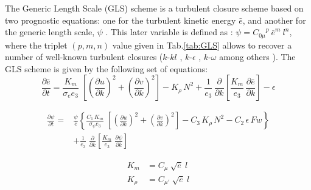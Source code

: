 \documentclass[../tex_main/NEMO_manual]{subfiles}
\begin{document}

The Generic Length Scale (GLS) scheme is a turbulent closure scheme based on 
two prognostic equations: one for the turbulent kinetic energy $\bar {e}$, and another 
for the generic length scale, $\psi$ \citep{Umlauf_Burchard_JMS03, Umlauf_Burchard_CSR05}. 
This later variable is defined as : $\psi = {C_{0\mu}}^{p} \ {\bar{e}}^{m} \ l^{n}$, 
where the triplet $(p, m, n)$ value given in Tab.\autoref{tab:GLS} allows to recover 
a number of well-known turbulent closures ($k$-$kl$ \citep{Mellor_Yamada_1982}, 
$k$-$\epsilon$ \citep{Rodi_1987}, $k$-$\omega$ \citep{Wilcox_1988} 
among others \citep{Umlauf_Burchard_JMS03,Kantha_Carniel_CSR05}). 
The GLS scheme is given by the following set of equations:
\begin{equation} \label{eq:zdfgls_e}
\frac{\partial \bar{e}}{\partial t} = 
\frac{K_m}{\sigma_e e_3 }\;\left[ {\left( \frac{\partial u}{\partial k} \right)^2
                                                   +\left( \frac{\partial v}{\partial k} \right)^2} \right]
-K_\rho \,N^2
+\frac{1}{e_3}\,\frac{\partial}{\partial k} \left[ \frac{K_m}{e_3}\,\frac{\partial \bar{e}}{\partial k} \right]
- \epsilon
\end{equation}

\begin{equation} \label{eq:zdfgls_psi}
   \begin{split}
\frac{\partial \psi}{\partial t} =& \frac{\psi}{\bar{e}} \left\{
\frac{C_1\,K_m}{\sigma_{\psi} {e_3}}\;\left[ {\left( \frac{\partial u}{\partial k} \right)^2
                                                                   +\left( \frac{\partial v}{\partial k} \right)^2} \right]
- C_3 \,K_\rho\,N^2   - C_2 \,\epsilon \,Fw   \right\}             \\
&+\frac{1}{e_3}  \;\frac{\partial }{\partial k}\left[ {\frac{K_m}{e_3 }
                                  \;\frac{\partial \psi}{\partial k}} \right]\;
   \end{split}
\end{equation}

\begin{equation} \label{eq:zdfgls_kz}
   \begin{split}
         K_m    &= C_{\mu} \ \sqrt {\bar{e}} \ l         \\
         K_\rho &= C_{\mu'}\ \sqrt {\bar{e}} \ l
   \end{split}
\end{equation}
\end{document}
